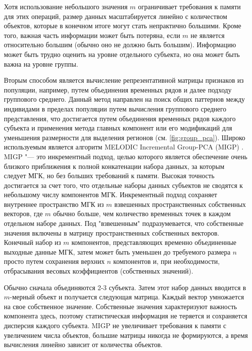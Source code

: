 Хотя использование небольшого значения $m$ ограничивает требования к памяти для этих операций, размер данных масштабируется линейно с количеством объектов, которые в конечном итоге могут стать непрактично большими. Кроме того, важная часть информации может быть потеряна, если $m$ не является относительно большим (обычно оно не должно быть большим). Информацию может быть трудно оценить на уровне отдельного субъекта, но она может быть важна на уровне группы. 

Вторым способом является вычисление репрезентативной матрицы признаков из популяции, например, путем объединения временных рядов и далее подходу группового среднего. Данный метод направлен на поиск общих паттернов между индивидами в пределах популяции путем вычисления группового среднего представления, что достигается путем объединения временных рядов каждого субъекта и применения метода главных компонент или его модификаций для уменьшения размерности для выделения регионов (см. \cref{fig:group_pca}). Широко используемым является алгоритм MELODIC Incremental Group-PCA (MIGP) \cite{rachakonda2016memory} . MIGP "--- это инкрементный подход, целью которого является обеспечение очень близкого приближения к полной конкатенации набора данных, за которым следует МГК, но без больших требований к памяти. Высокая точность достигается за счет того, что отдельные наборы данных субъектов не сводятся к небольшому числу компонентов МГК. Инкрементный подход сохраняет внутреннее пространство МГК из $m$ взвешенных пространственных собственных векторов, где $m$ обычно больше, чем количество временных точек в каждом отдельном наборе данных. Под "взвешенным" подразумевается, что собственные значения включены в матрицу пространственных собственных векторов. Конечный набор из $m$ компонентов, представляющих временно объединенные выходные данные МГК, затем может быть уменьшен до требуемого размера $n$ просто путем сохранения верхних $n$ компонентов и, при необходимости, отбрасывания весовых коэффициентов (собственных значений).

Обычно сначала объединяются 2-3 субъекта. Затем этот набор данных вводится в $m$-мерный объект и получается следующая матрица. Каждый вектор умножается на свое собственное значение. Собственные значения характеризуют важность компонента здесь, поэтому статистическая информация не теряется и сохраняется дисперсия каждого субъекта. MIGP не увеличивает требования к памяти с увеличением числа объектов, большие матрицы никогда не формируются, а время вычисления линейно зависит от количества объектов.

